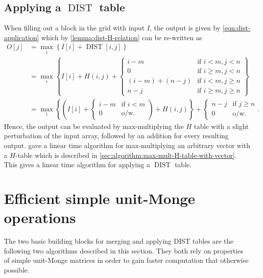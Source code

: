 \documentclass[twoside,11pt,openright]{report}
\newcommand{\DIST}{\operatorname{DIST}}
\begin{document}
\subsection{Applying a $\DIST$ table}
\label{sec:applying-a-dist-table}
When filling out a block in the grid with input $I$, the output is given by \cref{eqn:dist-application} which by \cref{lemma:dist-H-relation} can be re-written as
\begin{align*}
  O[j] &= \max_i \left\{ I[i] + \DIST[i, j] \right\} \\
    &= \max_i \left\{ I[i] + H(i, j) + \left\{
      \begin{array}{ll}
        i - m             & \text{if } i < m, j < n \\
        0                 & \text{if } i \geq m, j < n \\
        (i - m) + (n - j) & \text{if } i < m, j \geq n \\
        n - j             & \text{if } i \geq m, j \geq n
      \end{array}
    \right. \right\} \\
    &= \max_i\left\{ \left( I[i] + \left\{
      \begin{array}{ll}
        i - m     & \text{if } i < m \\
        0         & \text{o/w.}
      \end{array}
    \right. \right) + H(i, j) \right\} + \left\{
      \begin{array}{ll}
        n - j     & \text{if } j \geq n \\
        0         & \text{o/w.}
      \end{array}
    \right. .
\end{align*}
Hence, the output can be evaluated by max-multiplying the $H$ table with a slight perturbation of the input array, followed by an addition for every resulting output. \cite{Gawrychowski:2012:FAC:2422024.2422048} gave a linear time algorithm for max-multiplying an arbitrary vector with a $H$-table which is described in \cref{sec:algorithm:max-mult-H-table-with-vector}. This gives a linear time algorithm for applying a $\DIST$ table.

\section{Efficient simple unit-Monge operations}
The two basic building blocks for merging and applying DIST tables are the following two algorithms described in this section. They both rely on properties of simple unit-Monge matrices in order to gain faster computation that otherwise possible.
\end{document}
